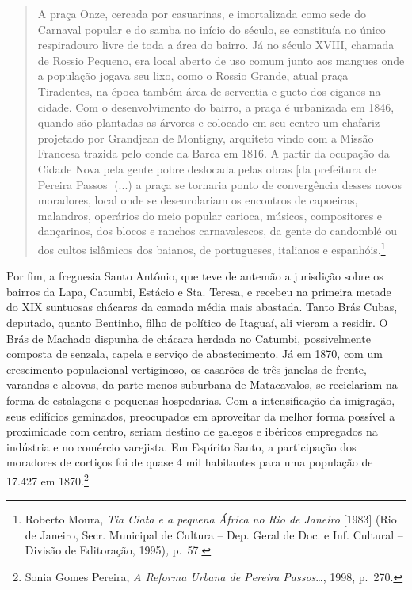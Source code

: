 \begin{quote}
A praça Onze, cercada por casuarinas, e imortalizada como sede do
Carnaval popular e do samba no início do século, se constituía no único
respiradouro livre de toda a área do bairro. Já no século XVIII, chamada
de Rossio Pequeno, era local aberto de uso comum junto aos mangues onde
a população jogava seu lixo, como o Rossio Grande, atual praça
Tiradentes, na época também área de serventia e gueto dos ciganos na
cidade. Com o desenvolvimento do bairro, a praça é urbanizada em 1846,
quando são plantadas as árvores e colocado em seu centro um chafariz
projetado por Grandjean de Montigny, arquiteto vindo com a Missão
Francesa trazida pelo conde da Barca em 1816. A partir da ocupação da
Cidade Nova pela gente pobre deslocada pelas obras {[}da prefeitura de
Pereira Passos{]} (...) a praça se tornaria ponto de convergência desses
novos moradores, local onde se desenrolariam os encontros de capoeiras,
malandros, operários do meio popular carioca, músicos, compositores e
dançarinos, dos blocos e ranchos carnavalescos, da gente do candomblé ou
dos cultos islâmicos dos baianos, de portugueses, italianos e
espanhóis.\footnote{Roberto Moura, \emph{Tia Ciata e a pequena África no
  Rio de Janeiro} {[}1983{]} (Rio de Janeiro, Secr. Municipal de Cultura
  -- Dep. Geral de Doc. e Inf. Cultural -- Divisão de Editoração,
  1995)\emph{,} p.~57.}
\end{quote}

Por fim, a freguesia Santo Antônio, que teve de antemão a jurisdição
sobre os bairros da Lapa, Catumbi, Estácio e Sta. Teresa, e recebeu na
primeira metade do XIX suntuosas chácaras da camada média mais abastada.
Tanto Brás Cubas, deputado, quanto Bentinho, filho de político de
Itaguaí, ali vieram a residir. O Brás de Machado dispunha de chácara
herdada no Catumbi, possivelmente composta de senzala, capela e serviço
de abastecimento. Já em 1870, com um crescimento populacional
vertiginoso, os casarões de três janelas de frente, varandas e alcovas,
da parte menos suburbana de Matacavalos, se reciclariam na forma de
estalagens e pequenas hospedarias. Com a intensificação da imigração,
seus edifícios geminados, preocupados em aproveitar da melhor forma
possível a proximidade com centro, seriam destino de galegos e ibéricos
empregados na indústria e no comércio varejista. Em Espírito Santo, a
participação dos moradores de cortiços foi de quase 4 mil habitantes
para uma população de 17.427 em 1870.\footnote{Sonia Gomes Pereira,
  \emph{A Reforma Urbana de Pereira Passos}\ldots{}, 1998, p.~270.}

